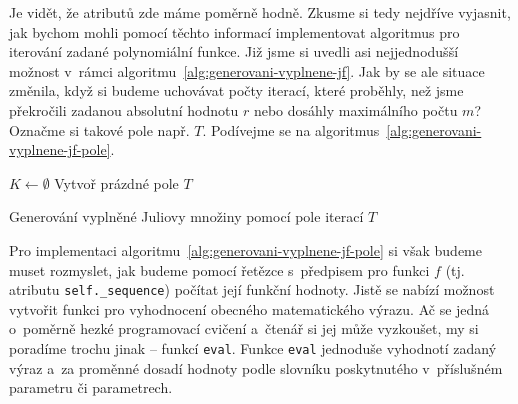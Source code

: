 Je vidět, že atributů zde máme poměrně hodně. Zkusme si tedy nejdříve vyjasnit, jak bychom mohli pomocí těchto informací implementovat algoritmus pro iterování zadané polynomiální funkce. Již jsme si uvedli asi nejjednodušší možnost v~rámci algoritmu~\ref{alg:generovani-vyplnene-jf}. Jak by se ale situace změnila, když si budeme uchovávat počty iterací, které proběhly, než jsme překročili zadanou absolutní hodnotu $r$ nebo dosáhly maximálního počtu $m$? Označme si takové pole např. $T$. Podívejme se na algoritmus~\ref{alg:generovani-vyplnene-jf-pole}.
\begin{algorithm}[h]
    $K\gets\emptyset$\;
    Vytvoř prázdné pole $T$\;
    \;
    \caption{Generování vyplněné Juliovy množiny pomocí pole iterací $T$}
    \label{alg:generovani-vyplnene-jf-pole}
\end{algorithm}
Pro implementaci algoritmu~\ref{alg:generovani-vyplnene-jf-pole} si však budeme muset rozmyslet, jak budeme pomocí řetězce s~předpisem pro funkci $f$ (tj. atributu \texttt{self.\_sequence}) počítat její funkční hodnoty. Jistě se nabízí možnost vytvořit funkci pro vyhodnocení obecného matematického výrazu. Ač se jedná o~poměrně hezké programovací cvičení a~čtenář si jej může vyzkoušet, my si poradíme trochu jinak -- funkcí \texttt{eval}. Funkce \texttt{eval} jednoduše vyhodnotí zadaný výraz a~za proměnné dosadí hodnoty podle slovníku poskytnutého v~příslušném parametru či parametrech.

